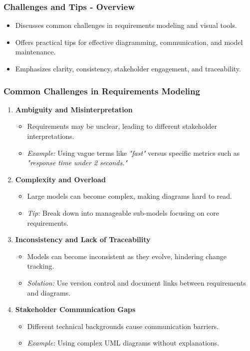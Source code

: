\documentclass{beamer}
\begin{document}
\begin{frame}[fragile]
\frametitle{Challenges and Tips - Overview}
\begin{itemize}
    \item Discusses common challenges in requirements modeling and visual tools.
    \item Offers practical tips for effective diagramming, communication, and model maintenance.
    \item Emphasizes clarity, consistency, stakeholder engagement, and traceability.
\end{itemize}
\end{frame}

\begin{frame}[fragile]
\frametitle{Common Challenges in Requirements Modeling}
\begin{enumerate}
    \item \textbf{Ambiguity and Misinterpretation}
    \begin{itemize}
        \item Requirements may be unclear, leading to different stakeholder interpretations.
        \item \textit{Example:} Using vague terms like \textit{"fast"} versus specific metrics such as \textit{"response time under 2 seconds."}
    \end{itemize}
    \item \textbf{Complexity and Overload}
    \begin{itemize}
        \item Large models can become complex, making diagrams hard to read.
        \item \textit{Tip:} Break down into manageable sub-models focusing on core requirements.
    \end{itemize}
    \item \textbf{Inconsistency and Lack of Traceability}
    \begin{itemize}
        \item Models can become inconsistent as they evolve, hindering change tracking.
        \item \textit{Solution:} Use version control and document links between requirements and diagrams.
    \end{itemize}
    \item \textbf{Stakeholder Communication Gaps}
    \begin{itemize}
        \item Different technical backgrounds cause communication barriers.
        \item \textit{Example:} Using complex UML diagrams without explanations.
    \end{itemize}
\end{enumerate}
\end{frame}
\end{document}
